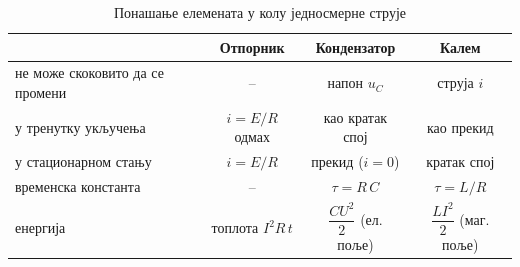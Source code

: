 \documentclass{article}
\begin{document}
\begin{table}[H]
    \centering
    \small
    \renewcommand{\arraystretch}{1.5}
    \begin{tabular}{lccc}
        \toprule
                                   & \textbf{Отпорник} & \textbf{Кондензатор} & \textbf{Калем} \\
        \midrule
        не може скоковито да се промени & --          & напон $u_C$          & струја $i$ \\
        у тренутку укључења        & $i = E/R$ одмах   & као кратак спој      & као прекид \\
        у стационарном стању       & $i = E/R$         & прекид ($i = 0$)     & кратак спој \\
        временска константа        & --                & $\tau = R\,C$        & $\tau = L/R$ \\
        енергија                   & топлота $I^2 R\,t$ & $\dfrac{C U^2}{2}$ (ел. поље) & $\dfrac{L I^2}{2}$ (маг. поље) \\
        \bottomrule
    \end{tabular}
    \caption{Понашање елемената у колу једносмерне струје}
    \label{tab:poredjenje-dc}
\end{table}
\end{document}
